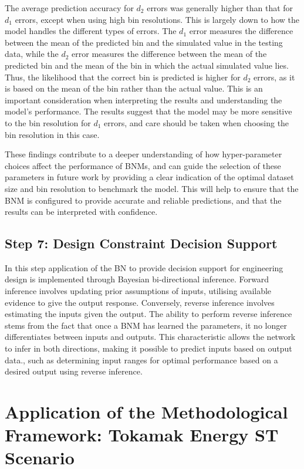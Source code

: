 \documentclass[journal]{IEEEtran}
\begin{document}
The average prediction accuracy for $d_{2}$ errors was generally higher than that for $d_{1}$ errors, except when using high bin resolutions. This is largely down to how the model handles the different types of errors. The $d_{1}$ error measures the difference between the mean of the predicted bin and the simulated value in the testing data, while the $d_{2}$ error measures the difference between the mean of the predicted bin and the mean of the bin in which the actual simulated value lies. Thus, the likelihood that the correct bin is predicted is higher for $d_{2}$ errors, as it is based on the mean of the bin rather than the actual value. This is an important consideration when interpreting the results and understanding the model's performance. The results suggest that the model may be more sensitive to the bin resolution for $d_{1}$ errors, and care should be taken when choosing the bin resolution in this case.

These findings contribute to a deeper understanding of how hyper-parameter choices affect the performance of BNMs, and can guide the selection of these parameters in future work by providing a clear indication of the optimal dataset size and bin resolution to benchmark the model. This will help to ensure that the BNM is configured to provide accurate and reliable predictions, and that the results can be interpreted with confidence.

\subsection{\textbf{Step 7}: Design Constraint Decision Support}\label{sec:meth_decision}

In this step application of the BN to provide decision support for engineering design is implemented through Bayesian bi-directional inference. Forward inference involves updating prior assumptions of inputs, utilising available evidence to give the output response. Conversely, reverse inference involves estimating the inputs given the output. The ability to perform reverse inference stems from the fact that once a BNM has learned the parameters, it no longer differentiates between inputs and outputs. This characteristic allows the network to infer in both directions, making it possible to predict inputs based on output data., such as determining input ranges for optimal performance based on a desired output using reverse inference. 

\section{Application of the Methodological Framework: Tokamak Energy ST Scenario}\label{sec:res_decision} 
\end{document}
